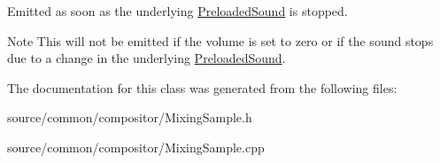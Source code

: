 Emitted as soon as the underlying \hyperlink{class_picto_1_1_preloaded_sound}{Preloaded\-Sound} is stopped. 

\begin{DoxyNote}{Note}
This will not be emitted if the volume is set to zero or if the sound stops due to a change in the underlying \hyperlink{class_picto_1_1_preloaded_sound}{Preloaded\-Sound}. 
\end{DoxyNote}


The documentation for this class was generated from the following files\-:\begin{DoxyCompactItemize}
\item 
source/common/compositor/Mixing\-Sample.\-h\item 
source/common/compositor/Mixing\-Sample.\-cpp\end{DoxyCompactItemize}
